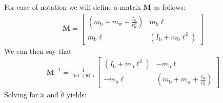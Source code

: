\documentclass[journal]{IEEEtran}
\begin{document}
For ease of notation we will define a matrix $\mathbf{M}$ as follows:
\begin{align}
    \mathbf{M} = \begin{bmatrix}
        (m_{\mathrm{b}}+m_{\mathrm{w}}+\frac{I_{\mathrm{w}}}{r_{\mathrm{w}}^2}) & m_{\mathrm{b}}\ell \\
        m_{\mathrm{b}}\ell & (I_{\mathrm{b}}+m_{\mathrm{b}}\ell^2)
    \end{bmatrix}
\end{align}
We can then say that
\begin{align}
\mathbf{M}^{-1}
=
\frac{1}{\det(\mathbf{M})}
\begin{bmatrix}
    (I_{\mathrm{b}}+m_{\mathrm{b}}\ell^2) & -m_{\mathrm{b}}\ell \\
    -m_{\mathrm{b}}\ell & (m_{\mathrm{b}}+m_{\mathrm{w}}+\frac{I_{\mathrm{w}}}{r_{\mathrm{w}}^2})
\end{bmatrix}
\end{align}
Solving for $\ddot{x}$ and $\ddot{\theta}$ yields:
\end{document}
